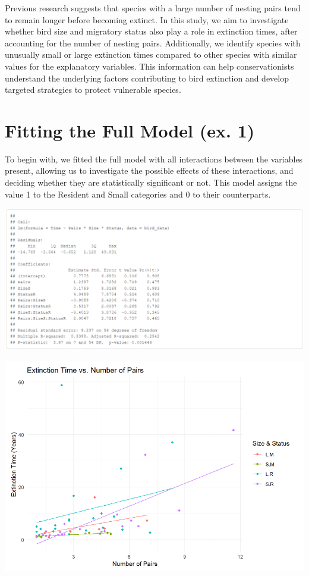 \documentclass{article}
\begin{document}
Previous research suggests that species with a large number of nesting pairs tend to remain longer before becoming extinct. In this study, we aim to investigate whether bird size and migratory status also play a role in extinction times, after accounting for the number of nesting pairs. Additionally, we identify species with unusually small or large extinction times compared to other species with similar values for the explanatory variables. This information can help conservationists understand the underlying factors contributing to bird extinction and develop targeted strategies to protect vulnerable species.

\section{Fitting the Full Model (ex. 1)}
To begin with, we fitted the full model with all interactions between the variables present, allowing us to investigate the possible effects of these interactions,
and deciding whether they are statistically significant or not. This model assigns the value 1 to the Resident and Small categories and 0 to their counterparts.

\includegraphics[scale=0.5]{tables/all-multiplied.png}


\begin{center}
\includegraphics[scale=0.5]{graphs/graph1.png}
\end{center}
\end{document}
